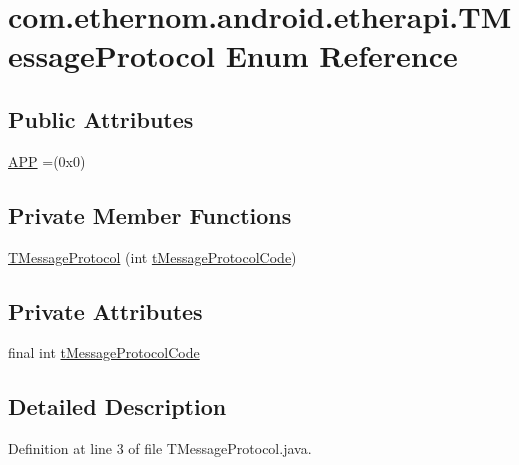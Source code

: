 \hypertarget{enumcom_1_1ethernom_1_1android_1_1etherapi_1_1_t_message_protocol}{}\section{com.\+ethernom.\+android.\+etherapi.\+T\+Message\+Protocol Enum Reference}
\label{enumcom_1_1ethernom_1_1android_1_1etherapi_1_1_t_message_protocol}
\subsection*{Public Attributes}
\begin{DoxyCompactItemize}
\item 
\mbox{\hyperlink{enumcom_1_1ethernom_1_1android_1_1etherapi_1_1_t_message_protocol_ad079375f6ebce0743379ff2411c450aa}{A\+PP}} =(0x0)
\end{DoxyCompactItemize}
\subsection*{Private Member Functions}
\begin{DoxyCompactItemize}
\item 
\mbox{\hyperlink{enumcom_1_1ethernom_1_1android_1_1etherapi_1_1_t_message_protocol_acec7a5bf24beff229fbbb7657ade6988}{T\+Message\+Protocol}} (int \mbox{\hyperlink{enumcom_1_1ethernom_1_1android_1_1etherapi_1_1_t_message_protocol_af1948ebfe67971c4c4d65b13439e1196}{t\+Message\+Protocol\+Code}})
\end{DoxyCompactItemize}
\subsection*{Private Attributes}
\begin{DoxyCompactItemize}
\item 
final int \mbox{\hyperlink{enumcom_1_1ethernom_1_1android_1_1etherapi_1_1_t_message_protocol_af1948ebfe67971c4c4d65b13439e1196}{t\+Message\+Protocol\+Code}}
\end{DoxyCompactItemize}


\subsection{Detailed Description}


Definition at line 3 of file T\+Message\+Protocol.\+java.



